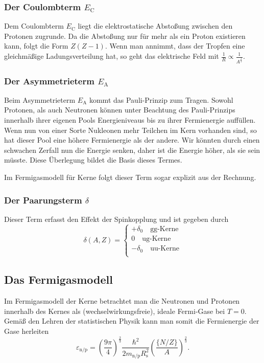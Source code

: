 \subsubsection{Der Coulombterm $E_\text{C}$}
Dem Coulombterm $E_\text{C}$ liegt die elektrostatische Abstoßung zwischen den Protonen zugrunde.
Da die Abstoßung nur für mehr als ein Proton existieren kann, folgt die Form $Z(Z-1)$.
Wenn man annimmt, dass der Tropfen eine gleichmäßige Ladungsverteilung hat, so geht das elektrische Feld mit $\frac{1}{R}\propto\frac{1}{A^\frac{1}{3}}$.

\subsubsection{Der Asymmetrieterm $E_\text{A}$}
Beim Asymmetrieterm $E_\text{A}$ kommt das Pauli-Prinzip zum Tragen.
Sowohl Protonen, als auch Neutronen können unter Beachtung des Pauli-Prinzips innerhalb ihrer eigenen Pools Energieniveaus bis zu ihrer Fermienergie auffüllen.
Wenn nun von einer Sorte Nukleonen mehr Teilchen im Kern vorhanden sind, so hat dieser Pool eine höhere Fermienergie als der andere.
Wir könnten durch einen schwachen Zerfall nun die Energie senken, daher ist die Energie höher, als sie sein müsste.
Diese Überlegung bildet die Basis dieses Termes.

Im Fermigasmodell für Kerne folgt dieser Term sogar explizit aus der Rechnung.

\subsubsection{Der Paarungsterm $\delta$}
Dieser Term erfasst den Effekt der Spinkopplung und ist gegeben durch
\begin{equation*}
	\delta(A,Z) = \begin{cases}
									+\delta_0\quad\text{gg-Kerne} \\
									0 \quad\text{ug-Kerne} \\
									-\delta_0\quad\text{uu-Kerne} \\
								\end{cases}
\end{equation*}

\subsection{Das Fermigasmodell}
Im Fermigasmodell der Kerne betrachtet man die Neutronen und Protonen innerhalb des Kernes als (wechselwirkungsfreie), ideale Fermi-Gase bei $T=0$.
Gemäß den Lehren der statistischen Physik kann man somit die Fermienergie der Gase herleiten
\begin{equation*}
	\varepsilon_\text{n/p} = \left(\frac{9\pi}{4}\right)^\frac{2}{3} \frac{\hbar^2}{2m_\text{n/p}R_\text{s}^2}\left(\frac{\{N/Z\}}{A}\right)^\frac{2}{3}.
\end{equation*}

